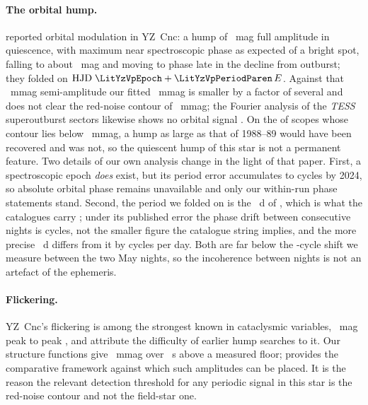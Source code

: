 \paragraph{The orbital hump.}
\citet{vanparadijs1994} reported orbital modulation in YZ~Cnc: a hump of
\LitYzHumpFullVpMag{}~mag full amplitude in quiescence, with maximum near
spectroscopic phase \LitYzHumpMaxPhase{} as expected of a bright spot,
falling to about \LitYzDeclineFullVpMag{}~mag and moving to phase
\LitYzDeclineMaxPhase{} late in the decline from outburst; they folded on
${\rm HJD}\;\LitYzVpEpoch + \LitYzVpPeriodParen\,E$.  Against that
\LitYzHumpSemiVpMmag{}~mmag semi-amplitude our fitted
\NumHumpAmpRangeMmag{}~mmag is smaller by a factor of several and does not
clear the red-noise contour of \NumHumpSelfContourMmag{}~mmag; the Fourier
analysis of the \emph{TESS} superoutburst sectors likewise shows no
orbital signal \citep{sun2026}.  On the
of \NumHumpScopesTested{} scopes whose contour lies below
\LitYzHumpSemiVpMmag{}~mmag, a hump as large as that of 1988--89 would have
been recovered and was not, so the quiescent hump of this star is not a
permanent feature.  Two details of our own analysis change in the light of
that paper.  First, a spectroscopic epoch \emph{does} exist, but its period
error accumulates to \LitYzVpEpochDriftCycles{} cycles by 2024, so absolute
orbital phase remains unavailable and only our within-run phase statements
stand.  Second, the period we folded on is the \LitYzShPeriod~d of
\citet{shafter1988}, which is what the catalogues carry
\citep{downes2001, watson2006}; under its published error the phase drift
between consecutive nights is \LitYzDayDriftSh{} cycles, not the smaller
figure the catalogue string implies, and the more precise
\LitYzVpPeriodD~d differs from it by \LitYzDaySlip{} cycles per day.  Both
are far below the \NumHumpPhaseNightShift{}-cycle shift we measure between
the two May nights, so the incoherence between nights is not an artefact of
the ephemeris.

\paragraph{Flickering.}
YZ~Cnc's flickering is among the strongest known in cataclysmic variables,
\LitYzFlickerPp{}~mag peak to peak \citep{moffett1974}, and
\citet{vanparadijs1994} attribute the difficulty of earlier hump searches
to it.  Our structure functions \citep[in the sense of][]{simonetti1985}
give \NumFlickerAmpRangeMmag{}~mmag over \NumFlickerTauRangeS{}~s above a
measured floor; \citet{bruch2021} provides the comparative framework
against which such amplitudes can be placed.  It is the reason the relevant
detection threshold for any periodic signal in this star is the red-noise
contour and not the field-star one.

